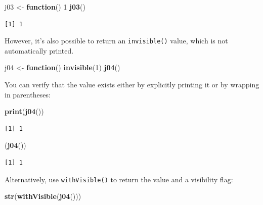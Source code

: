 \documentclass[]{book}
\newenvironment{Shaded}{\begin{snugshade}}{\end{snugshade}}
\newcommand{\ControlFlowTok}[1]{\textcolor[rgb]{0.13,0.29,0.53}{\textbf{#1}}}
\newcommand{\DecValTok}[1]{\textcolor[rgb]{0.00,0.00,0.81}{#1}}
\newcommand{\KeywordTok}[1]{\textcolor[rgb]{0.13,0.29,0.53}{\textbf{#1}}}
\newcommand{\NormalTok}[1]{#1}
\newcommand{\StringTok}[1]{\textcolor[rgb]{0.31,0.60,0.02}{#1}}
\theoremstyle{definition}
\theoremstyle{definition}
\theoremstyle{definition}
\theoremstyle{remark}
\begin{document}
\begin{Shaded}
\begin{Highlighting}[]
\NormalTok{j03 <-}\StringTok{ }\ControlFlowTok{function}\NormalTok{() }\DecValTok{1}
\KeywordTok{j03}\NormalTok{()}
\end{Highlighting}
\end{Shaded}

\begin{verbatim}
[1] 1
\end{verbatim}

However, it's also possible to return an \texttt{invisible()} value,
which is not automatically printed.

\begin{Shaded}
\begin{Highlighting}[]
\NormalTok{j04 <-}\StringTok{ }\ControlFlowTok{function}\NormalTok{() }\KeywordTok{invisible}\NormalTok{(}\DecValTok{1}\NormalTok{)}
\KeywordTok{j04}\NormalTok{()}
\end{Highlighting}
\end{Shaded}

You can verify that the value exists either by explicitly printing it or
by wrapping in parentheses:

\begin{Shaded}
\begin{Highlighting}[]
\KeywordTok{print}\NormalTok{(}\KeywordTok{j04}\NormalTok{())}
\end{Highlighting}
\end{Shaded}

\begin{verbatim}
[1] 1
\end{verbatim}

\begin{Shaded}
\begin{Highlighting}[]
\NormalTok{(}\KeywordTok{j04}\NormalTok{())}
\end{Highlighting}
\end{Shaded}

\begin{verbatim}
[1] 1
\end{verbatim}

Alternatively, use \texttt{withVisible()} to return the value and a
visibility flag:

\begin{Shaded}
\begin{Highlighting}[]
\KeywordTok{str}\NormalTok{(}\KeywordTok{withVisible}\NormalTok{(}\KeywordTok{j04}\NormalTok{()))}
\end{Highlighting}
\end{Shaded}
\end{document}
